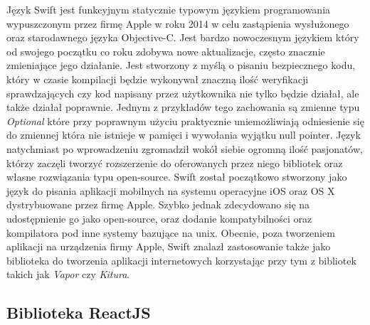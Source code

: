 Język Swift jest funkcyjnym statycznie typowym językiem programowania wypuszczonym przez firmę Apple w roku 2014 w celu zastąpienia wysłużonego oraz starodawnego języka Objective-C. Jest bardzo nowoczesnym językiem który od swojego początku co roku zdobywa nowe aktualizacje, często znacznie zmieniające jego działanie. Jest stworzony z myślą o pisaniu bezpiecznego kodu, który w czasie kompilacji będzie wykonywał znaczną ilość weryfikacji sprawdzających czy kod napisany przez użytkownika nie tylko będzie działał, ale także działał poprawnie. Jednym z przykładów tego zachowania są zmienne typu \textit{Optional} które przy poprawnym użyciu praktycznie uniemożliwiają odniesienie się do zmiennej która nie istnieje w pamięci i wywołania wyjątku null pointer. Język natychmiast po wprowadzeniu zgromadził wokół siebie ogromną ilość pasjonatów, którzy zaczęli tworzyć rozszerzenie do oferowanych przez niego bibliotek oraz własne rozwiązania typu open-source.\newline
Swift został początkowo stworzony jako język do pisania aplikacji mobilnych na systemu operacyjne iOS oraz OS X dystrybuowane przez firmę Apple. Szybko jednak zdecydowano się na udostępnienie go jako open-source, oraz dodanie kompatybilności oraz kompilatora pod inne systemy bazujące na unix. Obecnie, poza tworzeniem aplikacji na urządzenia firmy Apple, Swift znalazł zastosowanie także jako biblioteka do tworzenia aplikacji internetowych korzystając przy tym z bibliotek takich jak \textit{Vapor} czy \textit{Kitura}.

\subsection{Biblioteka ReactJS}

